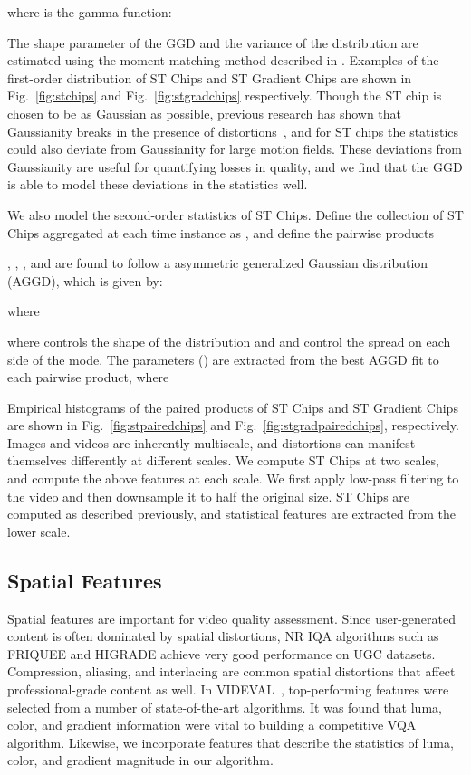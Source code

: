 \documentclass[journal]{IEEEtran}
\begin{document}
where  is the gamma function:

The shape parameter  of the GGD and the variance of the distribution are estimated using the moment-matching method described in \cite{estimation}. Examples of the first-order distribution of ST Chips and ST Gradient Chips are shown in Fig.~\ref{fig:stchips} and
Fig.~\ref{fig:stgradchips} respectively. Though the ST chip is chosen to be as Gaussian as possible, previous research has shown that Gaussianity breaks in the presence of distortions~\cite{brisque,higrade}, and for ST chips the statistics could also deviate from Gaussianity for large motion fields. These deviations from Gaussianity are useful for quantifying losses in quality, and we find that the GGD is able to model these deviations in the statistics well.

We also model the second-order statistics of ST Chips.  Define the collection of ST Chips aggregated at each time instance  as , and define the pairwise products

, , , and  are found to follow a asymmetric generalized Gaussian distribution (AGGD), which is given by:

where

where  controls the shape of the distribution and  and  control the spread on each side of the mode. The parameters () are extracted from the best AGGD fit to each pairwise product, where 


Empirical histograms of the paired products of ST Chips and ST Gradient Chips are shown in Fig.~\ref{fig:stpairedchips} and Fig.~\ref{fig:stgradpairedchips}, respectively. Images and videos are inherently multiscale, and distortions can manifest themselves differently at different scales. We compute ST Chips at two scales, and compute the above features at each scale. We first apply low-pass filtering to the video and then downsample it to half the original size. ST Chips are computed as described previously, and statistical features are extracted from the lower scale. 

\subsection{Spatial Features}
Spatial features are important for video quality assessment. Since user-generated content is often dominated by spatial distortions, NR IQA algorithms such as FRIQUEE and HIGRADE achieve very good performance on UGC datasets. Compression, aliasing, and interlacing are common spatial distortions that affect professional-grade content as well. In VIDEVAL~\cite{videval}, top-performing features were selected from a number of state-of-the-art algorithms. It was found that luma, color, and gradient information were vital to building a competitive VQA algorithm. Likewise, we incorporate features that describe the statistics of luma, color, and gradient magnitude in our algorithm.
\end{document}
